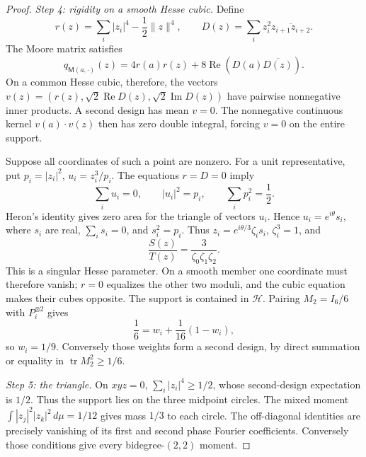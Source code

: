 \begin{proof}
\emph{Step 4: rigidity on a smooth Hesse cubic.}
Define
\[
 r(z)=\sum_i|z_i|^4-\frac12\|z\|^4,\qquad
 D(z)=\sum_i z_i^2\overline{z_{i+1}z_{i+2}}.
\]
The Moore matrix satisfies
\[
 q_{\mathsf M(a,\cdot)}(z)
 =4r(a)r(z)+8\operatorname{Re}(D(a)\overline{D(z)}).
\]
On a common Hesse cubic, therefore, the vectors
\(v(z)=(r(z),\sqrt2\operatorname{Re}D(z),\sqrt2\operatorname{Im}D(z))\)
have pairwise nonnegative inner products. A second design has mean
\(v=0\). The nonnegative continuous kernel \(v(a)\cdot v(z)\) then has
zero double integral, forcing \(v=0\) on the entire support.

Suppose all coordinates of such a point are nonzero. For a unit
representative, put \(p_i=|z_i|^2\), \(u_i=z_i^3/p_i\).
The equations \(r=D=0\) imply
\[
 \sum_i u_i=0,\qquad |u_i|^2=p_i,\qquad \sum_i p_i^2=\frac12.
\]
Heron's identity gives zero area for the triangle of vectors \(u_i\).
Hence \(u_i=e^{i\theta}s_i\), where \(s_i\) are real,
\(\sum_i s_i=0\), and \(s_i^2=p_i\). Thus
\(z_i=e^{i\theta/3}\zeta_i s_i\), \(\zeta_i^3=1\), and
\[
 \frac{S(z)}{T(z)}=\frac3{\zeta_0\zeta_1\zeta_2}.
\]
This is a singular Hesse parameter. On a smooth member one coordinate
must therefore vanish; \(r=0\) equalizes the other two moduli, and the
cubic equation makes their cubes opposite. The support is contained
in \(\mathcal H\). Pairing \(M_2=I_6/6\) with \(P_i^{\otimes2}\)
gives
\[
 \frac16=w_i+\frac1{16}(1-w_i),
\]
so \(w_i=1/9\). Conversely those weights form a second design, by direct
summation or equality in \(\operatorname{tr}M_2^2\ge1/6\).

\emph{Step 5: the triangle.}
On \(xyz=0\), \(\sum_i|z_i|^4\ge1/2\), whose second-design expectation
is \(1/2\). Thus the support lies on the three midpoint circles.
The mixed moment \(\int|z_j|^2|z_k|^2\,d\mu=1/12\) gives mass \(1/3\)
to each circle. The off-diagonal identities are precisely vanishing
of its first and second phase Fourier coefficients. Conversely those
conditions give every bidegree-\((2,2)\) moment.
\end{proof}

